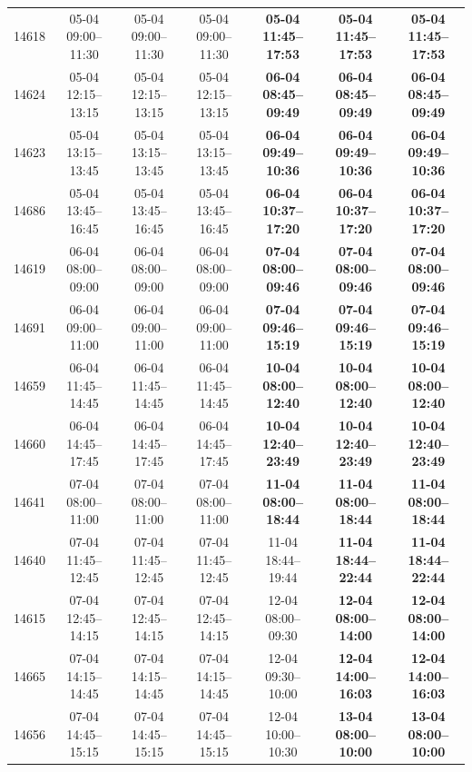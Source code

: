 \begin{table}[htbp]
\begin{tabular}{|r|c|c|c|c|c|c|}
14618 & 05-04 09:00--11:30 & 05-04 09:00--11:30 & 05-04 09:00--11:30 & \textbf{05-04 11:45--17:53} & \textbf{05-04 11:45--17:53} & \textbf{05-04 11:45--17:53} \\ 
14624 & 05-04 12:15--13:15 & 05-04 12:15--13:15 & 05-04 12:15--13:15 & \textbf{06-04 08:45--09:49} & \textbf{06-04 08:45--09:49} & \textbf{06-04 08:45--09:49} \\ 
14623 & 05-04 13:15--13:45 & 05-04 13:15--13:45 & 05-04 13:15--13:45 & \textbf{06-04 09:49--10:36} & \textbf{06-04 09:49--10:36} & \textbf{06-04 09:49--10:36} \\ 
14686 & 05-04 13:45--16:45 & 05-04 13:45--16:45 & 05-04 13:45--16:45 & \textbf{06-04 10:37--17:20} & \textbf{06-04 10:37--17:20} & \textbf{06-04 10:37--17:20} \\ 
14619 & 06-04 08:00--09:00 & 06-04 08:00--09:00 & 06-04 08:00--09:00 & \textbf{07-04 08:00--09:46} & \textbf{07-04 08:00--09:46} & \textbf{07-04 08:00--09:46} \\ 
14691 & 06-04 09:00--11:00 & 06-04 09:00--11:00 & 06-04 09:00--11:00 & \textbf{07-04 09:46--15:19} & \textbf{07-04 09:46--15:19} & \textbf{07-04 09:46--15:19} \\ 
14659 & 06-04 11:45--14:45 & 06-04 11:45--14:45 & 06-04 11:45--14:45 & \textbf{10-04 08:00--12:40} & \textbf{10-04 08:00--12:40} & \textbf{10-04 08:00--12:40} \\ 
14660 & 06-04 14:45--17:45 & 06-04 14:45--17:45 & 06-04 14:45--17:45 & \textbf{10-04 12:40--23:49} & \textbf{10-04 12:40--23:49} & \textbf{10-04 12:40--23:49} \\ 
14641 & 07-04 08:00--11:00 & 07-04 08:00--11:00 & 07-04 08:00--11:00 & \textbf{11-04 08:00--18:44} & \textbf{11-04 08:00--18:44} & \textbf{11-04 08:00--18:44} \\ 
14640 & 07-04 11:45--12:45 & 07-04 11:45--12:45 & 07-04 11:45--12:45 & 11-04 18:44--19:44 & \textbf{11-04 18:44--22:44} & \textbf{11-04 18:44--22:44} \\ 
14615 & 07-04 12:45--14:15 & 07-04 12:45--14:15 & 07-04 12:45--14:15 & 12-04 08:00--09:30 & \textbf{12-04 08:00--14:00} & \textbf{12-04 08:00--14:00} \\ 
14665 & 07-04 14:15--14:45 & 07-04 14:15--14:45 & 07-04 14:15--14:45 & 12-04 09:30--10:00 & \textbf{12-04 14:00--16:03} & \textbf{12-04 14:00--16:03} \\ 
14656 & 07-04 14:45--15:15 & 07-04 14:45--15:15 & 07-04 14:45--15:15 & 12-04 10:00--10:30 & \textbf{13-04 08:00--10:00} & \textbf{13-04 08:00--10:00} \\ 

\end{tabular}
\end{table}
